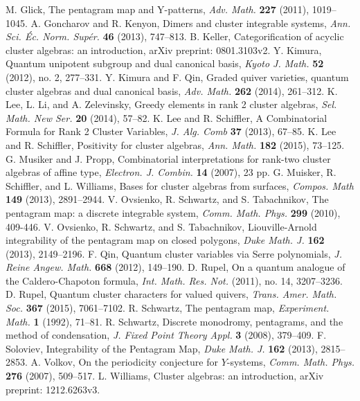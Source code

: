 \documentclass{amsart}
\theoremstyle{definition}
\theoremstyle{remark}
\numberwithin{equation}{section}
\begin{document}
\begin{thebibliography}{99}
	 M. Glick, The pentagram map and Y-patterns, \textsl{Adv. Math.} \textbf{227} (2011), 1019--1045.
	 A. Goncharov and R. Kenyon, Dimers and cluster integrable systems, \textsl{Ann. Sci. \'Ec. Norm. Sup\'er.} \textbf{46} (2013), 747--813.
   B. Keller, Categorification of acyclic cluster algebras: an introduction, arXiv preprint: 0801.3103v2.
   Y. Kimura, Quantum unipotent subgroup and dual canonical basis, \textsl{Kyoto J. Math.} \textbf{52} (2012), no. 2, 277--331.
   Y. Kimura and F. Qin, Graded quiver varieties, quantum cluster algebras and dual canonical basis, \textsl{Adv. Math.} \textbf{262} (2014), 261--312.
   K. Lee, L. Li, and A. Zelevinsky, Greedy elements in rank 2 cluster algebras, \textsl{Sel. Math. New Ser.} \textbf{20} (2014), 57--82.
   K. Lee and R. Schiffler, A Combinatorial Formula for Rank 2 Cluster Variables, \textsl{J. Alg. Comb} \textbf{37} (2013), 67--85.
   K. Lee and R. Schiffler, Positivity for cluster algebras, \textsl{Ann. Math.} \textbf{182} (2015), 73--125.
	 G. Musiker and J. Propp, Combinatorial interpretations for rank-two cluster algebras of affine type, \textsl{ Electron. J. Combin.} \textbf{14} (2007), 23 pp.
	 G. Muisker, R. Schiffler, and L. Williams, Bases for cluster algebras from surfaces, \textsl{Compos. Math} \textbf{149} (2013), 2891--2944.
	 V. Ovsienko, R. Schwartz, and S. Tabachnikov, The pentagram map: a discrete integrable system, \textsl{Comm. Math. Phys.} \textbf{299} (2010), 409-446.
	 V. Ovsienko, R. Schwartz, and S. Tabachnikov, Liouville-Arnold integrability of the pentagram map on closed polygons, \textsl{Duke Math. J.} \textbf{162} (2013), 2149--2196.
   F. Qin, Quantum cluster variables via Serre polynomials, \textsl{J. Reine Angew. Math.} \textbf{668} (2012), 149--190.
   D. Rupel, On a quantum analogue of the Caldero-Chapoton formula, \textsl{Int. Math. Res. Not.} (2011), no. 14, 3207--3236.
   D. Rupel, Quantum cluster characters for valued quivers, \textsl{Trans. Amer. Math. Soc.} \textbf{367} (2015), 7061--7102.
	 R. Schwartz, The pentagram map, \textsl{Experiment. Math.} \textbf{1} (1992), 71--81.
	 R. Schwartz, Discrete monodromy, pentagrams, and the method of condensation, \textsl{J. Fixed Point Theory Appl.} \textbf{3} (2008), 379--409.
	 F. Soloviev, Integrability of the Pentagram Map, \textsl{Duke Math. J.} \textbf{162} (2013), 2815--2853.
	 A. Volkov, On the periodicity conjecture for $Y$-systems, \textsl{Comm. Math. Phys.} \textbf{276} (2007), 509--517.
   L. Williams, Cluster algebras: an introduction, arXiv preprint: 1212.6263v3.
\end{thebibliography}
\end{document}
